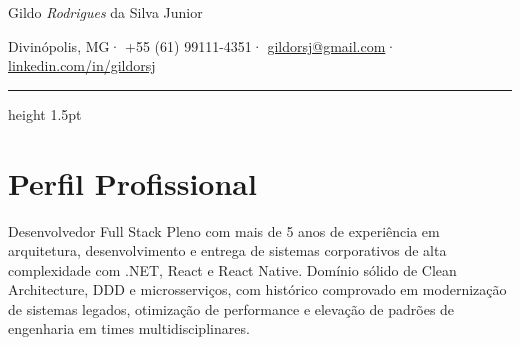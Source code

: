 \documentclass[10pt, a4paper]{article}
\begin{document}
	
	\begin{center}
		{\serifDisplay\fontsize{34}{38}\selectfont\color{cvdark}%
			Gildo \textit{\color{cvgreen}Rodrigues} da Silva Junior%
		}\par\vspace{6pt}
		
		{\monoFont\fontsize{8.5}{10}\selectfont\color{cvgray}%
			Divinópolis, MG\enspace·\enspace
			+55 (61) 99111-4351\enspace·\enspace
			\href{mailto:gildorsj@gmail.com}{gildorsj@gmail.com}\enspace·\enspace
			\href{https://linkedin.com/in/gildorsj}{linkedin.com/in/gildorsj}%
		}\par\vspace{8pt}
		
		\par
	\end{center}
	
	\vspace{3pt}
	{\color{cvgreen}\hrule height 1.5pt}
	\vspace{6pt}
	
	\section{Perfil Profissional}
	
	{\fontsize{9.5}{16}\selectfont\color{cvgray}%
		Desenvolvedor Full Stack Pleno com
		{\selectfont\color{cvdark}mais de 5 anos de experiência}
		em arquitetura, desenvolvimento e entrega de sistemas corporativos de alta complexidade com
		{\selectfont\color{cvdark}.NET, React e React Native}.
		Domínio sólido de
		{\selectfont\color{cvdark}Clean Architecture, DDD e microsserviços},
		com histórico comprovado em modernização de sistemas legados, otimização de performance
		e elevação de padrões de engenharia em times multidisciplinares.%
	}\par
	
\end{document}
